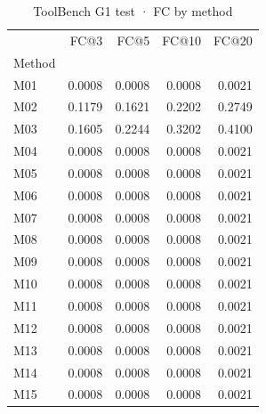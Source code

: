 \begin{table}
\caption{ToolBench G1 test · FC by method}
\label{tab:ToolBench-G1-test-comparison-comparison-fullcoverage}
\begin{tabular}{lrrrr}
\toprule
 & FC@3 & FC@5 & FC@10 & FC@20 \\
Method &  &  &  &  \\
\midrule
M01 & 0.0008 & 0.0008 & 0.0008 & 0.0021 \\
M02 & 0.1179 & 0.1621 & 0.2202 & 0.2749 \\
M03 & 0.1605 & 0.2244 & 0.3202 & 0.4100 \\
M04 & 0.0008 & 0.0008 & 0.0008 & 0.0021 \\
M05 & 0.0008 & 0.0008 & 0.0008 & 0.0021 \\
M06 & 0.0008 & 0.0008 & 0.0008 & 0.0021 \\
M07 & 0.0008 & 0.0008 & 0.0008 & 0.0021 \\
M08 & 0.0008 & 0.0008 & 0.0008 & 0.0021 \\
M09 & 0.0008 & 0.0008 & 0.0008 & 0.0021 \\
M10 & 0.0008 & 0.0008 & 0.0008 & 0.0021 \\
M11 & 0.0008 & 0.0008 & 0.0008 & 0.0021 \\
M12 & 0.0008 & 0.0008 & 0.0008 & 0.0021 \\
M13 & 0.0008 & 0.0008 & 0.0008 & 0.0021 \\
M14 & 0.0008 & 0.0008 & 0.0008 & 0.0021 \\
M15 & 0.0008 & 0.0008 & 0.0008 & 0.0021 \\
\bottomrule
\end{tabular}
\end{table}
